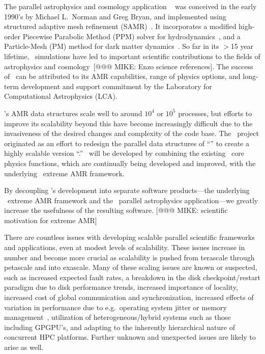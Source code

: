 \documentclass[11pt,letterpaper]{article}
\begin{document}


 The parallel astrophysics and
cosmology application \enzo~\cite{OsBr04} was conceived in the early
1990's by Michael L.~Norman and Greg Bryan, and implemented using
structured adaptive mesh refinement (SAMR)~\cite{BeCo89}.  It
incorporates a modified high-order Piecewise Parabolic Method (PPM)
solver for hydrodynamics~\cite{WoCo84b}, and a Particle-Mesh (PM)
method for dark matter dynamics~\cite{HoEa88}.  So far in its $>$15
year lifetime, \enzo\ simulations have led to important scientific
contributions to the fields of astrophysics and cosmology~[@@@ MIKE:
Enzo science references].  The success of \enzo\ can be attributed to
its AMR capabilities, range of physics options, and long-term
development and support commitment by the Laboratory for Computational
Astrophysics (LCA).

\enzo's AMR data structures scale well to around $10^4$ or $10^5$
processes, but efforts to improve its scalability beyond this have
become increasingly difficult due to the invasiveness of the desired
changes and complexity of the code base.  The \cello\ project
originated as an effort to redesign the parallel data structures of
``\enzo'' to create a highly scalable version ``\enzoii.''  \enzoii\
will be developed by combining the existing \enzo\ core physics
functions, which are continually being developed and improved, with
the underlying \cello\ extreme AMR framework.

By decoupling \enzoii's development into separate software
products---the underlying \cello\ extreme AMR framework and the
\enzoii\ parallel astrophysics application---we greatly increase the
usefulness of the resulting software.  [@@@ MIKE: scientific
motivation for extreme AMR]

 There are countless issues
with developing scalable parallel scientific frameworks and
applications, even at modest levels of scalability.  These issues
increase in number and become more crucial as scalability is pushed
from terascale through petascale and into exascale.  Many of these
scaling issues are known or suspected, such as
%
increased expected fault rates,
%
a breakdown in the disk checkpoint/restart paradigm due to disk
performance trends,
%
%
increased importance of locality,
%
increased cost of global communication and synchronization,
%
%
increased effects of variation in performance due to e.g.~operating
system jitter or memory management~\cite{StSh09},
%
utilization of heterogeneous/hybrid systems such as those including
GPGPU's,
%
and adapting to the inherently hierarchical nature of concurrent HPC
platforms.  Further unknown and unexpected issues are likely to arise
as well.
\end{document}
